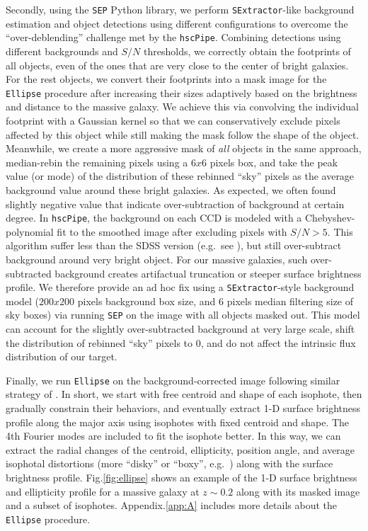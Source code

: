 \documentclass{emulateapj}
\begin{document}
\begin{CJK*}{UTF8}{gbsn}
    Secondly, using the \texttt{SEP} Python library, we perform \texttt{SExtractor}-like
    background estimation and object detections using different configurations to 
    overcome the ``over-deblending'' challenge met by the \texttt{hscPipe}. 
    Combining detections using different backgrounds and $S/N$ thresholds, 
    we correctly obtain the footprints of all objects, even of the ones that are 
    very close to the center of bright galaxies.
    For the rest objects, we convert their footprints into a mask image for the
    \texttt{Ellipse} procedure after increasing their sizes adaptively based on the 
    brightness and distance to the massive galaxy. 
    We achieve this via convolving the individual footprint with a Gaussian kernel
    so that we can conservatively exclude pixels affected by this object while still 
    making the mask follow the shape of the object. 
    Meanwhile, we create a more aggressive mask of \emph{all} objects in the same 
    approach, median-rebin the remaining pixels using a $6x6$ pixels box, and take 
    the peak value (or mode) of the distribution of these rebinned ``sky'' pixels 
    as the average background value around these bright galaxies.
    As expected, we often found slightly negative value that indicate over-subtraction 
    of background at certain degree. 
    In \texttt{hscPipe}, the background on each CCD is modeled with a 
    Chebyshev-polynomial fit to the smoothed image after excluding pixels with $S/N >5$.
    This algorithm suffer less than the SDSS version (e.g.\ see \citealt{Blanton2011}),
    but still over-subtract background around very bright object. 
    For our massive galaxies, such over-subtracted background creates artifactual
    truncation or steeper surface brightness profile.
    We therefore provide an ad hoc fix using a \texttt{SExtractor}-style background 
    model ($200x200$ pixels background box size, and 6 pixels median filtering size of 
    sky boxes) via running \texttt{SEP} on the image with all objects masked out.
    This model can account for the slightly over-subtracted background at very large 
    scale, shift the distribution of rebinned ``sky'' pixels to 0, and do not affect the 
    intrinsic flux distribution of our target. 
    
    Finally, we run \texttt{Ellipse} on the background-corrected image following similar 
    strategy of \citep{Li2012}.
    In short, we start with free centroid and shape of each isophote, then gradually 
    constrain their behaviors, and eventually extract 1-D surface brightness profile 
    along the major axis using isophotes with fixed centroid and shape.
    The 4th Fourier modes are included to fit the isophote better. 
    In this way, we can extract the radial changes of the centroid, ellipticity, 
    position angle, and average isophotal distortions (more ``disky'' or ``boxy'', 
    e.g.\ \citealt{Kormendy2009}) along with the surface brightness profile.  
    Fig.\ref{fig:ellipse} shows an example of the 1-D surface brightness and 
    ellipticity profile for a massive galaxy at $z\sim0.2$ along with its masked 
    image and a subset of isophotes.  
    Appendix.\ref{app:A} includes more details about the \texttt{Ellipse} procedure.
    

\end{CJK*}
\end{document}
